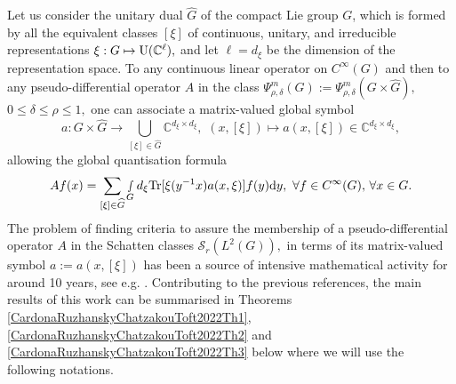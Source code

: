 \documentclass[12pt, reqno]{amsart}
\theoremstyle{definition}
\theoremstyle{remark}
\numberwithin{equation}{section}
\begin{document}
Let us consider the unitary dual $\widehat{G}$ of the compact Lie group $G$, which is formed by all the equivalent classes $[\xi]$ of continuous, unitary, and irreducible representations $\xi:G\mapsto \textnormal{U}(\mathbb{C}^{\ell}),$ and let $\ell=d_\xi$ be the dimension of the representation space. 
To any continuous linear operator on $C^\infty(G)$ and then to any pseudo-differential operator $A$ in the class $\Psi^m_{\rho,\delta}(G):=\Psi^m_{\rho,\delta}(G\times \widehat{G}),$ $0\leq \delta\leq \rho\leq 1,$ one can associate a matrix-valued global symbol $$ a:G\times \widehat{G}\rightarrow\bigcup_{[\xi]\in \widehat{G} }\mathbb{C}^{d_\xi\times d_\xi}, \,\,(x,[\xi])\mapsto a(x,[\xi])\in \mathbb{C}^{d_\xi\times d_\xi}, $$ allowing the global quantisation formula
\begin{equation}
    Af(x)=\sum_{[\xi]\in \widehat{G}}\smallint\limits_{G}d_\xi \textnormal{Tr}[\xi(y^{-1}x)a(x,\xi)]f(y)\textnormal{d}y,\,\,\forall f\in C^\infty(G),\,\forall x\in G.
\end{equation}
The problem of finding criteria  to assure the membership of a pseudo-differential operator $A$ in the Schatten classes $\mathscr{S}_{r}(L^2(G)),$ in terms of its  matrix-valued symbol $a:=a(x,[\xi])$  has been a source of intensive mathematical activity for around 10 years, see e.g. \cite{Delgado2013,DelgadoRuzhansky2014,DelRuzTrace1111,DelRuzTrace111,Delgado2015,DelgadoRuzhanskyWang,DelgadoRuzhanskyWang2,DelgadoRuzhanskyTokmagambetov2017,DelRuzTrace11,DelgadoRuzhansky2018MS,DelRuzTrace1,ChatzakouDelgadoRuzhansky2021,DelgadoRuzhansky2021,Delgado2022,ChatzakouDelgadoRuzhansky2022,Chatzakou2022,CardonaKumar2021,CardonaDelCorral2020,CardonaDelCorral2020K,CardonaKumar2019,Cardona2019,CardonaDelgadoRuzhanksyLOcalWeyl,CardonaDelgadoRuzhansky2022}.  Contributing to the previous references, the main results of this work can be summarised in  Theorems \ref{CardonaRuzhanskyChatzakouToft2022Th1}, \ref{CardonaRuzhanskyChatzakouToft2022Th2} and \ref{CardonaRuzhanskyChatzakouToft2022Th3} below where we will use the following notations.
\end{document}
